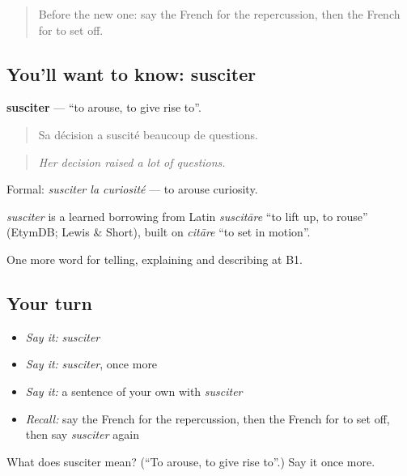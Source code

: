\begin{quote}
Before the new one: say the French for the repercussion, then the French for to set off.
\end{quote}

\subsection*{You'll want to know: susciter}
\textbf{susciter} — \textquotedblleft{}to arouse, to give rise to\textquotedblright{}.

\begin{quote}
Sa décision a suscité beaucoup de questions.
\end{quote}

\begin{quote}
\emph{Her decision raised a lot of questions.}
\end{quote}

Formal: \emph{susciter la curiosité} — to arouse curiosity.

\begin{cousinweb}
\emph{susciter} is a learned borrowing from Latin \emph{suscitāre} \textquotedblleft{}to lift up, to rouse\textquotedblright{} (EtymDB; Lewis \& Short), built on \emph{citāre} \textquotedblleft{}to set in motion\textquotedblright{}.
\end{cousinweb}

\begin{grammarlens}[title={What you've built}]
One more word for telling, explaining and describing at B1.
\end{grammarlens}

\subsection*{Your turn}
\begin{itemize}
\raggedright
  \item \emph{Say it:} \emph{susciter}
  \item \emph{Say it:} \emph{susciter}, once more
  \item \emph{Say it:} a sentence of your own with \emph{susciter}
  \item \emph{Recall:} say the French for the repercussion, then the French for to set off, then say \emph{susciter} again
\end{itemize}

\begin{tcolorbox}[breakable,colback=teal!4,colframe=teal!35!black,title={Before you move on}]
What does susciter mean? (\textquotedblleft{}To arouse, to give rise to\textquotedblright{}.) Say it once more.
\end{tcolorbox}
